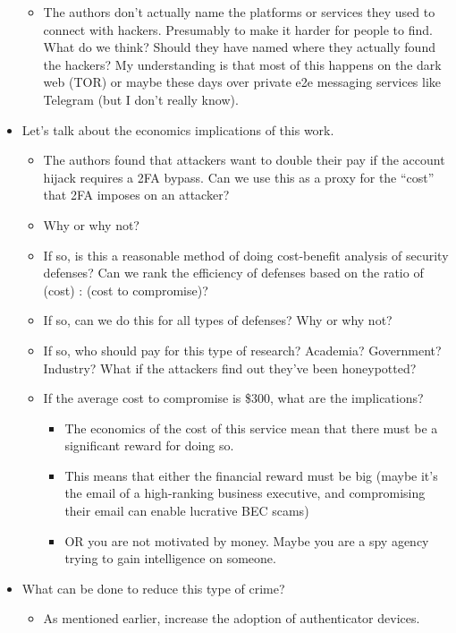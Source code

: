 \documentclass[11pt]{article}
\begin{document}
\begin{itemize}
\begin{itemize}
\begin{itemize}
        \end{itemize}
        \item The authors don't actually name the platforms or services they used to connect with hackers. Presumably to make it harder for people to find. What do we think? Should they have named where they actually found the hackers? My understanding is that most of this happens on the dark web (TOR) or maybe these days over private e2e messaging services like Telegram (but I don't really know).
    \end{itemize}
    \item Let's talk about the economics implications of this work.
    \begin{itemize}
        \item The authors found that attackers want to double their pay if the account hijack requires a 2FA bypass. Can we use this as a proxy for the ``cost'' that 2FA imposes on an attacker?
        \item Why or why not?
        \item If so, is this a reasonable method of doing cost-benefit analysis of security defenses? Can we rank the efficiency of defenses based on the ratio of (cost) : (cost to compromise)?
        \item If so, can we do this for all types of defenses? Why or why not? 
        \item If so, who should pay for this type of research? Academia? Government? Industry? What if the attackers find out they've been honeypotted?
        \item If the average cost to compromise is \$300, what are the implications?
        \begin{itemize}
            \item The economics of the cost of this service mean that there must be a significant reward for doing so.
            \item This means that either the financial reward must be big (maybe it's the email of a high-ranking business executive, and compromising their email can enable lucrative BEC scams)
            \item OR you are not motivated by money. Maybe you are a spy agency trying to gain intelligence on someone.
        \end{itemize}
    \end{itemize}
    \item What can be done to reduce this type of crime?
    \begin{itemize}
        \item As mentioned earlier, increase the adoption of authenticator devices. 

\end{itemize}
\end{itemize}
\end{document}
